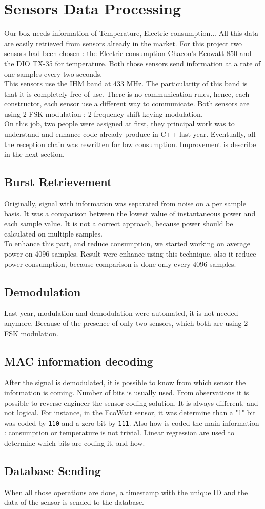 %
%
\section{Sensors Data Processing}
Our box needs information of Temperature, Electric consumption... All this data are easily retrieved from sensors already in the market. For this project two sensors had been chosen : the Electric consumption Chacon's Ecowatt 850 and the DIO TX-35 for temperature. Both those sensors send information at a rate of one samples every two seconds.\\
This sensors use the IHM band at 433 MHz. The particularity of this band is that it is completely free of use. There is no communication rules, hence, each constructor, each sensor use a different way to communicate. Both sensors are using 2-FSK modulation : 2 frequency shift keying modulation. \\
On this job, two people were assigned at first, they principal work was to understand and enhance code already produce in \textsc{C++} last year. Eventually, all the reception chain was rewritten for low consumption. Improvement is describe in the next section.
\subsection{Burst Retrievement}
Originally, signal with information was separated from noise on a per sample basis. It was a comparison between the lowest value of instantaneous power and each sample value. It is not a correct approach, because power should be calculated on multiple samples.\\
To enhance this part, and reduce consumption, we started working on average power on 4096 samples. Result were enhance using this technique, also it reduce power consumption, because comparison is done only every 4096 samples.
\subsection{Demodulation}
Last year, modulation and demodulation were automated, it is not needed anymore. Because of the presence of only two sensors, which both are using 2-FSK modulation.
\subsection{MAC information decoding}
After the signal is demodulated, it is possible to know from which sensor the information is coming. Number of bits is usually used.
From observations it is possible to reverse engineer the sensor coding solution. It is always different, and not logical. For instance, in the EcoWatt sensor, it was determine than a "1" bit was coded by \texttt{110} and a zero bit by \texttt{111}. Also how is coded the main information : consumption or temperature is not trivial. Linear regression are used to determine which bits are coding it, and how.
\subsection{Database Sending}
When all those operations are done, a timestamp with the unique ID and the data of the sensor is sended to the database.